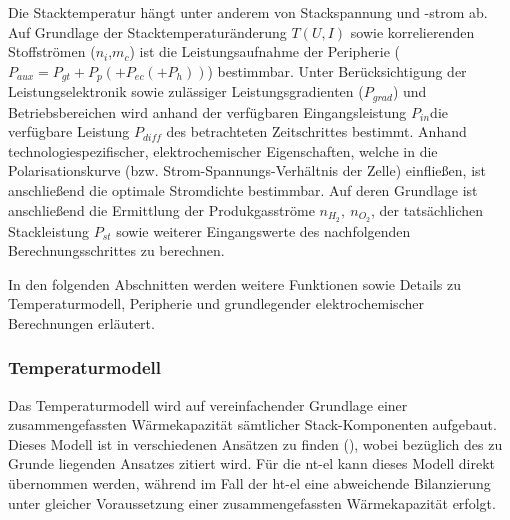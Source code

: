 \documentclass[onecolumn,10pt,titlepage]{article}
\begin{document}
Die Stacktemperatur hängt unter anderem von Stackspannung und -strom ab.
Auf Grundlage der Stacktemperaturänderung $T(U,I)$ sowie korrelierenden Stoffströmen ($n_{i}$,$m_c$) ist die Leistungsaufnahme der Peripherie ($P_{aux} = P_{gt}+P_{p}(+P_{ec}(+P_{h}))$) bestimmbar. Unter Berücksichtigung der Leistungselektronik sowie zulässiger Leistungsgradienten ($P_{grad}$) und Betriebsbereichen wird anhand der verfügbaren Eingangsleistung $P_{in}$die verfügbare Leistung $P_{diff}$  des betrachteten Zeitschrittes bestimmt. Anhand technologiespezifischer, elektrochemischer Eigenschaften, welche in die Polarisationskurve (bzw. Strom-Spannungs-Verhältnis der Zelle) einfließen, ist anschließend die optimale Stromdichte bestimmbar. Auf deren Grundlage ist anschließend die Ermittlung der Produkgasströme $n_{H_2}, ~n_{O_2}$, der tatsächlichen Stackleistung $P_{st}$ sowie weiterer Eingangswerte des nachfolgenden Berechnungsschrittes zu berechnen.  

In den folgenden Abschnitten werden weitere Funktionen sowie Details zu Temperaturmodell, Peripherie und grundlegender elektrochemischer Berechnungen erläutert.  


%	
%	


 \subsubsection{Temperaturmodell}
 \label{subsubs_mod_TEmp}
Das Temperaturmodell wird auf vereinfachender Grundlage einer zusammengefassten Wärmekapazität sämtlicher Stack-Komponenten aufgebaut. Dieses Modell ist in verschiedenen Ansätzen zu finden (\cite{Espinosa-Lopez2018,Gabrielli2016}), wobei bezüglich des zu Grunde liegenden Ansatzes \cite{Ulleberg2003} zitiert wird. Für die \gls{nt}-\gls{el} kann dieses Modell direkt übernommen werden, während im Fall der \gls{ht}-\gls{el} eine abweichende Bilanzierung unter gleicher Voraussetzung einer zusammengefassten Wärmekapazität erfolgt.\\
\end{document}
